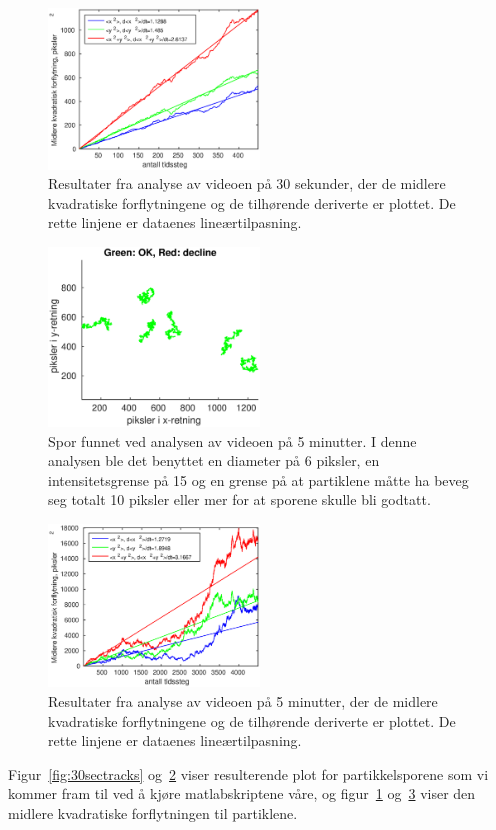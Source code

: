 \documentclass[a4paper,11pt, twocolumn]{article}
\begin{document}
\begin{figure}[!ht]
	\centering
	\includegraphics[width = 0.5\textwidth]{Lab/brownian-motion/Video/30sekmoving}
	\caption{Resultater fra analyse av videoen på 30 sekunder, der de midlere kvadratiske forflytningene og de tilhørende deriverte er plottet. De rette linjene er dataenes lineærtilpasning.}
	\label{fig:30secMoving}
\end{figure}

\begin{figure}[!ht]
	\centering
	\includegraphics[width = 0.5\textwidth]{Lab/brownian-motion/Video/5mintracks}
	\caption{Spor funnet ved analysen av videoen på 5 minutter. I denne analysen ble det benyttet en diameter på 6 piksler, en intensitetsgrense på 15 og en grense på at partiklene måtte ha beveg seg totalt 10 piksler eller mer for at sporene skulle bli godtatt.}
	\label{fig:5mintracks}
\end{figure}


\begin{figure}[!ht]
	\centering
	\includegraphics[width = 0.5\textwidth]{Lab/brownian-motion/Video/5minmoving}
	\caption{Resultater fra analyse av videoen på 5 minutter, der de midlere kvadratiske forflytningene og de tilhørende deriverte er plottet. De rette linjene er dataenes lineærtilpasning.}
	\label{fig:5minmoving}
\end{figure}
Figur~\ref{fig:30sectracks} og~\ref{fig:5mintracks} viser resulterende plot for partikkelsporene som vi kommer fram til ved å kjøre matlabskriptene våre, og figur~\ref{fig:30secMoving} og~\ref{fig:5minmoving} viser den midlere kvadratiske forflytningen til partiklene. 
\end{document}
